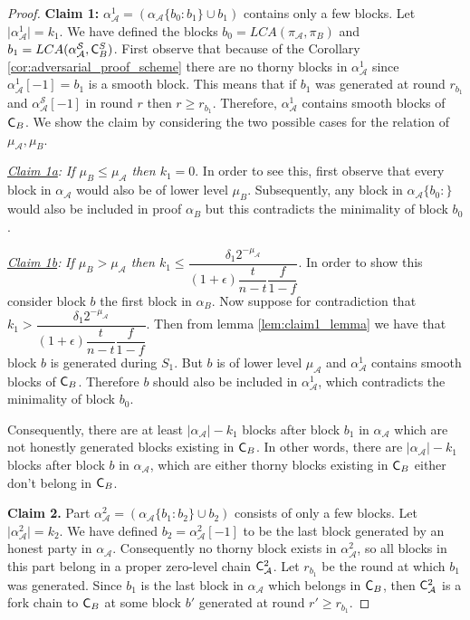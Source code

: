 \begin{proof}
\textbf{Claim 1:} $\alpha_\mathcal{A}^1 = (\alpha_\mathcal{A}\{b_0 : b_1\} \cup b_1)$ contains only a few blocks. Let $\lvert \alpha^1_\mathcal{A} \rvert = k_1$. We have defined the blocks $b_0 = LCA(\pi_\mathcal{A}, \pi_B)$ and $b_1 = LCA(\alpha^{\mathcal{S}}_\mathcal{A}, \mathsf{C}^S_B)$. First observe that because of the Corollary \ref{cor:adversarial_proof_scheme} there are no thorny blocks in $\alpha_\mathcal{A}^1$ since $\alpha_\mathcal{A}^1[-1] = b_1$ is a smooth block. This means that if $b_1$ was generated at round $r_{b_1}$ and $\alpha^{\mathcal{S}}_\mathcal{A}[-1]$ in round $r$ then $r \geq r_{b_1}$. Therefore, $\alpha_\mathcal{A}^1$ contains smooth blocks of $\mathsf{C}_B$. We show the claim by considering the two possible cases for the relation of $\mu_\mathcal{A}, \mu_B$.

\textit{\underline{Claim 1a}:} \textit{If $\mu_B \leq \mu_\mathcal{A}$ then $k_1 = 0$}. In order to see this, first observe that every block in $\alpha_\mathcal{A}$ would also be of lower level $\mu_B$. Subsequently, any block in $\alpha_\mathcal{\mathcal{A}}\{b_0{:}\}$ would also be included in proof $\alpha_B$ but this contradicts the minimality of block $b_0$.

\textit{\underline{Claim 1b}:} \textit{If $\mu_B > \mu_\mathcal{A}$ then $k_1 \leq \dfrac{\delta_1 2^{-\mu_\mathcal{A}}}{(1+\epsilon)\dfrac{t}{n-t}\dfrac{f}{1-f}}$}. In order to show this consider block $b$ the first block in $\alpha_B$. Now suppose for contradiction that $k_1 > \dfrac{\delta_1 2^{-\mu_\mathcal{A}}}{(1+\epsilon)\dfrac{t}{n-t}\dfrac{f}{1-f}}$. Then from lemma \ref{lem:claim1_lemma} we have that block $b$ is generated during $S_1$. But $b$ is of lower level $\mu_\mathcal{A}$ and $\alpha^1_\mathcal{A}$ contains smooth blocks of $\mathsf{C}_B$. Therefore $b$ should also be included in $\alpha^1_\mathcal{A}$, which contradicts the minimality of block $b_0$.

Consequently, there are at least $\lvert \alpha_\mathcal{A} \rvert - k_1$ blocks after block $b_1$ in $\alpha_\mathcal{A}$ which are not honestly generated blocks existing in $\mathsf{C}_B$. In other words, there are $\vert \alpha_\mathcal{A} \vert - k_1$ blocks after block $b$ in $\alpha_\mathcal{A}$, which are either thorny blocks existing in $\mathsf{C}_B$ either don't belong in $\mathsf{C}_B$.

\textbf{Claim 2.}
Part $\alpha_\mathcal{A}^2 = (\alpha_\mathcal{A}\{b_1:b_2\} \cup b_2)$ consists of only a few blocks. Let $ \lvert \alpha_\mathcal{A}^2 \rvert = k_2$. We have defined $b_2 = \alpha_\mathcal{A}^2[-1]$ to be the last block generated by an honest party in $\alpha_\mathcal{A}$. Consequently no thorny block exists in $\alpha_\mathcal{A}^2$, so all blocks in this part belong in a proper zero-level chain $\mathsf{C}_\mathcal{A}^2$.  Let $r_{b_1}$ be the round at which $b_1$ was generated. Since $b_1$ is the last block in $\alpha_\mathcal{A}$ which belongs in $\mathsf{C}_B$, then $\mathsf{C}_\mathcal{A}^2$ is a fork chain to $\mathsf{C}_B$ at some block $b'$ generated at round $r' \geq r_{b_1}$.


\end{proof}
